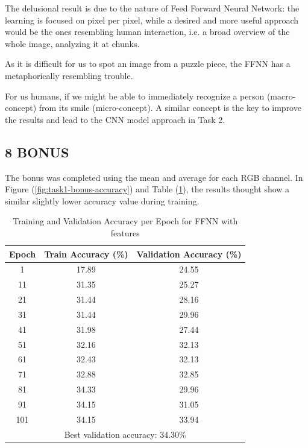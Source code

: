\documentclass[11pt]{scrartcl}
\begin{document}
The delusional result is due to the nature of Feed Forward Neural Network:
the learning is focused on pixel per pixel,
while a desired and more useful approach would be the ones resembling human interaction,
i.e. a broad overview of the whole image,
analyzing it at chunks.

As it is difficult for us to spot an image from a puzzle piece,
the FFNN has a metaphorically resembling trouble.

For us humans, if we might be able to immediately recognize a person (macro-concept) 
from its smile (micro-concept).
A similar concept is the key to improve the results 
and lead to the CNN model approach in Task 2.


\subsection*{8 BONUS}

The bonus was completed using the mean and average for each RGB channel.
In Figure (\ref{fig:task1-bonus-accuracy}) 
and Table (\ref{tab:task1-bonus-accuracy}), 
the results thought show a similar slightly lower accuracy value during training.

\begin{table}[htbp]
\centering
\caption{Training and Validation Accuracy per Epoch for FFNN with features}
\begin{tabular}{ccc}
\toprule
\textbf{Epoch} & \textbf{Train Accuracy (\%)} & \textbf{Validation Accuracy (\%)} \\
\midrule
1    & 17.89  & 24.55  \\
11   & 31.35  & 25.27  \\
21   & 31.44  & 28.16  \\
31   & 31.44  & 29.96  \\
41   & 31.98  & 27.44  \\
51   & 32.16  & 32.13  \\
61   & 32.43  & 32.13  \\
71   & 32.88  & 32.85  \\
81   & 34.33  & 29.96  \\
91   & 34.15  & 31.05  \\
101  & 34.15  & 33.94  \\
\midrule
\multicolumn{3}{c}{Best validation accuracy: 34.30\%} \\
\bottomrule
\end{tabular}
\label{tab:task1-bonus-accuracy}
\end{table}
\end{document}
